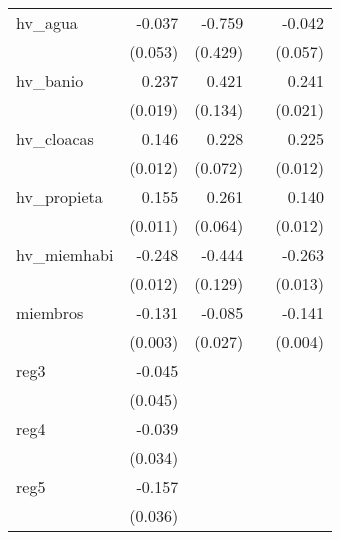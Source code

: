 {\begin{longtable}{l*{4}{D{.}{.}{-1}}}
\addlinespace
hv\_agua     &      -0.037         &      -0.759         &                     &      -0.042         \\
            &     (0.053)         &     (0.429)         &                     &     (0.057)         \\
\addlinespace
hv\_banio    &       0.237\sym{***}&       0.421\sym{**} &                     &       0.241\sym{***}\\
            &     (0.019)         &     (0.134)         &                     &     (0.021)         \\
\addlinespace
hv\_cloacas  &       0.146\sym{***}&       0.228\sym{**} &                     &       0.225\sym{***}\\
            &     (0.012)         &     (0.072)         &                     &     (0.012)         \\
\addlinespace
hv\_propieta &       0.155\sym{***}&       0.261\sym{***}&                     &       0.140\sym{***}\\
            &     (0.011)         &     (0.064)         &                     &     (0.012)         \\
\addlinespace
hv\_miemhabi &      -0.248\sym{***}&      -0.444\sym{***}&                     &      -0.263\sym{***}\\
            &     (0.012)         &     (0.129)         &                     &     (0.013)         \\
\addlinespace
miembros    &      -0.131\sym{***}&      -0.085\sym{**} &                     &      -0.141\sym{***}\\
            &     (0.003)         &     (0.027)         &                     &     (0.004)         \\
\addlinespace
reg3        &      -0.045         &                     &                     &                     \\
            &     (0.045)         &                     &                     &                     \\
\addlinespace
reg4        &      -0.039         &                     &                     &                     \\
            &     (0.034)         &                     &                     &                     \\
\addlinespace
reg5        &      -0.157\sym{***}&                     &                     &                     \\
            &     (0.036)         &                     &                     &                     \\

\end{longtable}}
